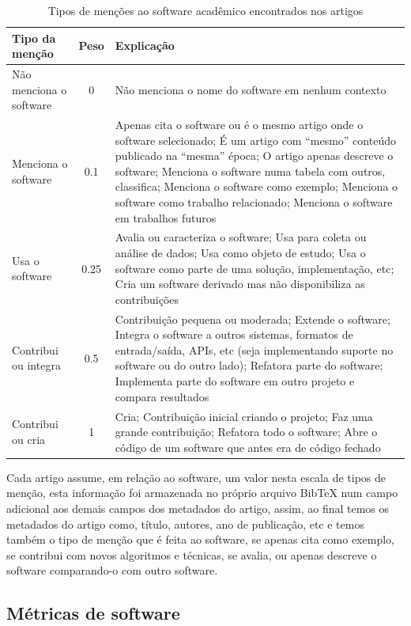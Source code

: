 \begin{table}[h]
\caption{Tipos de menções ao software acadêmico encontrados nos artigos}
\centering
\begin{tabular}{ l c p{10cm} }
  \hline
  Tipo da menção   & Peso & Explicação \\
  \hline
  Não menciona o software  & 0  & Não menciona o nome do software em nenhum contexto \\
  Menciona o software  & 0.1    & Apenas cita o software ou é o mesmo artigo onde o software selecionado; É um artigo com ``mesmo'' conteúdo publicado na ``mesma'' época; O artigo apenas descreve o software; Menciona o software numa tabela com outros, classifica; Menciona o software como exemplo; Menciona o software como trabalho relacionado; Menciona o software em trabalhos futuros \\
  Usa o software   & 0.25    & Avalia ou caracteriza o software; Usa para coleta ou análise de dados; Usa como objeto de estudo; Usa o software como parte de uma solução, implementação, etc; Cria um software derivado mas não disponibiliza as contribuições \\
  Contribui ou integra & 0.5 & Contribuição pequena ou moderada; Extende o software; Integra o software a outros sistemas, formatos de entrada/saída, APIs, etc (seja implementando suporte no software ou do outro lado); Refatora parte do software; Implementa parte do software em outro projeto e compara resultados \\
  Contribui ou cria & 1 & Cria; Contribuição inicial criando o projeto; Faz uma grande contribuição; Refatora todo o software; Abre o código de um software que antes era de código fechado \\
  \hline
\end{tabular}
\label{coding-scheme-mention}
\end{table}

Cada artigo assume, em relação ao software, um valor nesta escala de tipos de
menção, esta informação foi armazenada no próprio arquivo BibTeX num campo
adicional aos demais campos dos metadados do artigo, assim, ao final temos os
metadados do artigo como, título, autores, ano de publicação, etc e temos
também o tipo de menção que é feita ao software, se apenas cita como exemplo,
se contribui com novos algoritmos e técnicas, se avalia, ou apenas descreve o
software comparando-o com outro software.

\subsection{Métricas de software}

